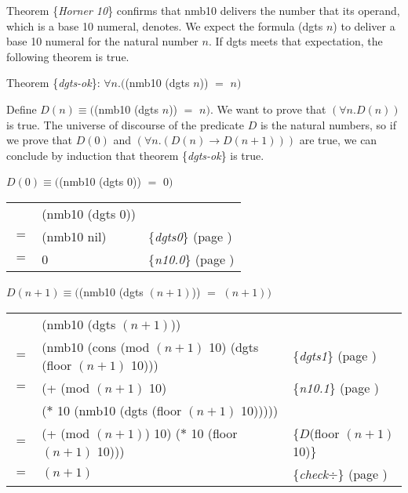 Theorem \{\emph{Horner 10}\} confirms that \textsf{nmb10} delivers the
number that its operand, which is a base 10 numeral, denotes.
We expect the formula \textsf{(dgts $n$)} to deliver a base 10 numeral
for the natural number $n$. If \textsf{dgts} meets that expectation,
the following theorem is true.

\begin{center}
\label{dgts-ok}
Theorem \{\emph{dgts-ok}\}:
$\forall n.($\textsf{(nmb10 (dgts $n$))} $=$ $n)$
\end{center}

Define $D(n) \equiv ($\textsf{(nmb10 (dgts $n$))} $=$ $n)$.
We want to prove that $(\forall n.D(n))$ is true.
The universe of discourse
of the predicate $D$ is the natural numbers,
so if we prove that $D(0)$ and
$(\forall n.(D(n) \rightarrow D(n+1)))$
are true, we can conclude by induction
that theorem \{\emph{dgts-ok}\} is true.

\begin{center}
$D(0) \equiv ($\textsf{(nmb10 (dgts $0$))} $=$ $0)$ \\
\begin{tabular}{rll}
    \hline
    & \textsf{(nmb10 (dgts $0$))} & \\
$=$ & \textsf{(nmb10 nil)}        & \{\emph{dgts0}\} (page \pageref{dgts-defun}) \\
$=$ & \textsf{0}                  & \{\emph{n10.0}\} (page \pageref{nmb10-defun}) \\
\end{tabular}
\end{center}

\begin{center}
$D(n+1) \equiv ($\textsf{(nmb10 (dgts $(n+1)$))} $=$ $(n + 1))$ \\
\begin{tabular}{rll}
    \hline
    & \textsf{(nmb10 (dgts $(n+1)$))}           & \\
$=$ & \textsf{(nmb10 (cons (mod $(n+1)$ 10) (dgts (floor $(n+1)$ 10)))}  & \{\emph{dgts1}\} (page \pageref{dgts-defun})\\
$=$ & \textsf{(+ (mod $(n+1)$ 10)}              & \{\emph{n10.1}\} (page \pageref{nmb10-defun})\\
    & \phantom{\textsf{(+ }}\textsf{($*$ 10 (nmb10 (dgts (floor $(n+1)$ 10)))))} &\\
$=$ & \textsf{(+ (mod $(n+1)$) 10) ($*$ 10 (floor $(n+1)$ 10)))}  & \{$D$(floor $(n+1)$ 10)\} \\
$=$ & $(n+1)$  & \{\emph{check}$\div$\} (page \pageref{third-grade-division})
\end{tabular}
\end{center}

